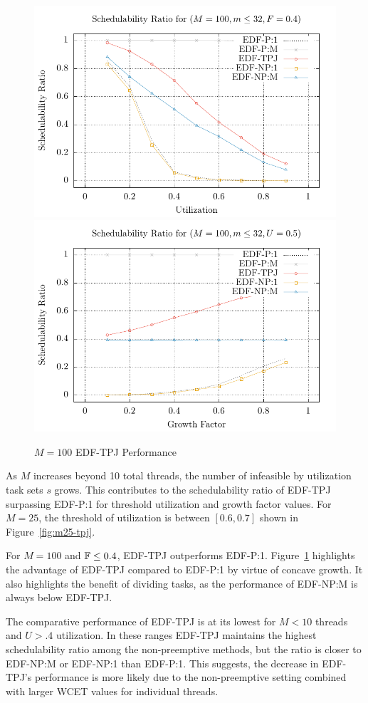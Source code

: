 \documentclass[a4paper,UKenglish,cleveref,autoref,english]{lipics-v2019}
\begin{document}
\begin{figure}[ht]
  \centering
  \includegraphics[width=\cwidth]{plot/2D-UFS/2D-M100m32F0_4xS}\quad
  \includegraphics[width=\cwidth]{plot/2D-UFS/2D-M100m32U0_5xS}%
  \caption{${M = 100}$ EDF-TPJ Performance}
  \label{fig:m100-tpj}
\end{figure}

As ${M}$ increases beyond 10 total threads, the number of infeasible
by utilization task sets ${s}$ grows. This contributes to the
schedulability ratio of EDF-TPJ surpassing EDF-P:1 for
threshold utilization and growth factor values. For ${M = 25}$, the
threshold of utilization is between ${[0.6,0.7]}$ shown in
Figure~\ref{fig:m25-tpj}.

For ${M = 100}$ and ${\mathbb{F} \le 0.4}$, EDF-TPJ outperforms
EDF-P:1. Figure~\ref{fig:m100-tpj} highlights the advantage of
EDF-TPJ compared to EDF-P:1 by virtue of concave growth. It also
highlights the benefit of dividing tasks, as the performance of
EDF-NP:M is always below EDF-TPJ.

The comparative performance of EDF-TPJ is at its lowest
for ${M < 10}$ threads and ${U > .4}$ utilization. In these ranges
EDF-TPJ maintains the highest schedulability ratio among the
non-preemptive methods, but the ratio is closer to EDF-NP:M or
EDF-NP:1 than EDF-P:1. This suggests, the decrease in EDF-TPJ's
performance is more likely due to the non-preemptive setting combined
with larger WCET values for individual threads.




\end{document}
